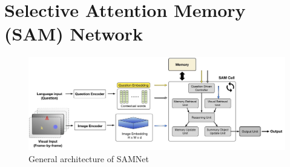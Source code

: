 \section{Selective Attention Memory (SAM) Network}



\begin{figure}
	\centering
	\includegraphics[width=\textwidth]{img/architecture/SAMNETmodel}
	\caption{General architecture of SAMNet}
	\label{fig:samnet}
\end{figure}

